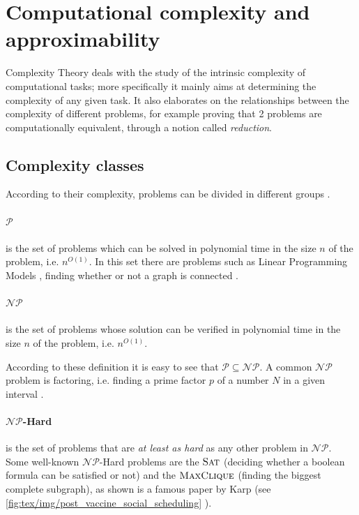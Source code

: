 \clearpage

\section{Computational complexity and \\approximability}%
\label{sec:computational_complexity_and_approximability}

Complexity Theory deals with the study of the intrinsic complexity of
computational tasks; more specifically it mainly aims at determining the
complexity of any given task. It also elaborates on the relationships between
the complexity of different problems, for example proving that 2 problems are
computationally equivalent\cite{9780521884730}, through a notion called
\emph{reduction}.

\subsection{Complexity classes}%
\label{par:complexity_classes}

According to their complexity, problems can be divided in different groups
\cite{DemaineFall2014}.

\paragraph{$\mathcal{P} $}%
\label{par:p}
is the set of problems which can be solved in polynomial time in the size $n$ of
the problem, i.e. $n^{O(1)} $. In this set there are problems such as Linear
Programming Models \cite{KHACHIYAN198053}\cite{Karmarkar1984}, finding whether
or not a graph is connected \cite{9780521884730}.

\paragraph{$\mathcal{NP} $}%
\label{par:np} is the set of problems whose solution can be verified in
polynomial time in the size $n$ of the problem, i.e. $n^{O(1)} $.

According to these definition it is easy to see that $\mathcal{P} \subseteq
	\mathcal{NP} $. A common $\mathcal{NP} $ problem is factoring, i.e. finding a
prime factor $p$ of a number $N$ in a given interval \cite{SanjeevArora2017}.

\paragraph{$\mathcal{NP} $-Hard}%
\label{par:_np_hard} is the set of problems that are \emph{at least as hard} as
any other problem in $\mathcal{NP} $. Some well-known $\mathcal{NP} $-Hard
problems are the $\textsc{Sat}$ (deciding whether a boolean formula can be
satisfied or not) and the $\textsc{MaxClique}$ (finding the biggest complete
subgraph), as shown is a famous paper by Karp \cite{Miller1972} (see
\autoref{fig:tex/img/post_vaccine_social_scheduling} ).

